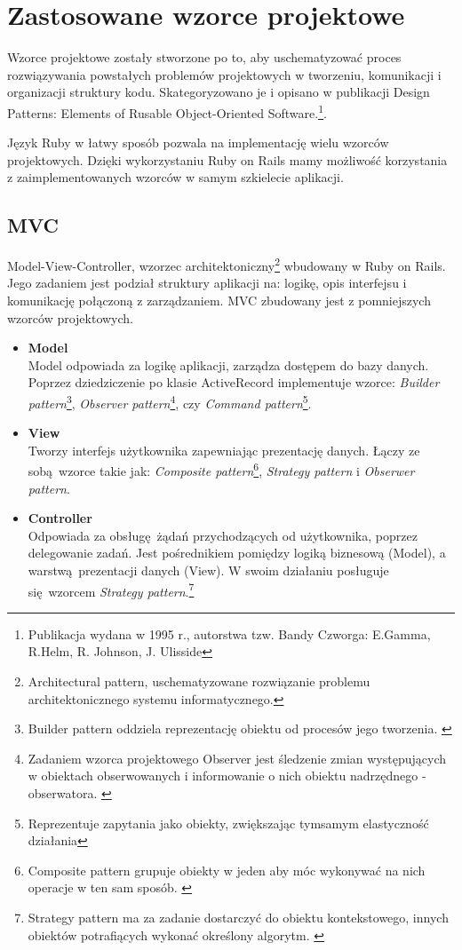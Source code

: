 \section{Zastosowane wzorce projektowe}
Wzorce projektowe zostały stworzone po to, aby uschematyzować proces rozwiązywania powstałych problemów projektowych w tworzeniu, komunikacji i organizacji struktury kodu. Skategoryzowano je i opisano w publikacji Design Patterns: Elements of Rusable Object-Oriented Software.\footnote{Publikacja wydana w 1995 r., autorstwa tzw. Bandy Czworga: E.Gamma, R.Helm, R. Johnson, J. Ulisside}.

Język Ruby w łatwy sposób pozwala na implementację wielu wzorców projektowych. Dzięki wykorzystaniu Ruby on Rails mamy możliwość korzystania z zaimplementowanych wzorców w samym szkielecie aplikacji.
  \subsection{MVC}
   Model-View-Controller, wzorzec architektoniczny\footnote{Architectural pattern, uschematyzowane rozwiązanie problemu architektonicznego systemu informatycznego.} wbudowany w Ruby on Rails. Jego zadaniem jest podział struktury aplikacji na: logikę, opis interfejsu i komunikację połączoną z zarządzaniem.
   MVC zbudowany jest z pomniejszych wzorców projektowych.
    \begin{itemize}
      \item \textbf {Model} \\
      Model odpowiada za logikę aplikacji, zarządza dostępem do bazy danych.
      Poprzez dziedziczenie po klasie ActiveRecord implementuje wzorce: \emph{Builder pattern}\footnote{Builder pattern oddziela reprezentację obiektu od procesów jego tworzenia. \cite{ruby_patterns}}, \emph{Observer pattern}\footnote{Zadaniem wzorca projektowego Observer jest śledzenie zmian występujących w obiektach obserwowanych i informowanie o nich obiektu nadrzędnego - obserwatora. \cite{ruby_patterns}}, czy \emph{Command pattern}\footnote{Reprezentuje zapytania jako obiekty, zwiększając tymsamym elastyczność działania\cite{ruby_patterns}}.
      \item \textbf {View} \\
      Tworzy interfejs użytkownika zapewniając prezentację danych. Łączy ze sobą wzorce takie jak: \emph{Composite pattern}\footnote{Composite pattern grupuje obiekty w jeden aby móc wykonywać na nich operacje w ten sam sposób. \cite{ruby_patterns}}, \emph{Strategy pattern} i \emph{Obserwer pattern}.
      \item \textbf {Controller} \\
      Odpowiada za obsługę żądań przychodzących od użytkownika, poprzez delegowanie zadań. Jest pośrednikiem pomiędzy logiką biznesową (Model), a warstwą prezentacji danych (View). W swoim działaniu posługuje się wzorcem \emph{Strategy pattern}.\footnote{ Strategy pattern ma za zadanie dostarczyć do obiektu kontekstowego, innych obiektów potrafiących wykonać określony algorytm. \cite{ruby_patterns}}
    \end{itemize}

